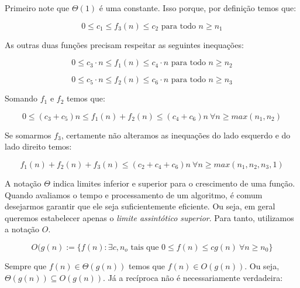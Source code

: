 \begin{example}

  Primeiro note que $\Theta(1)$ é uma constante.
  Isso porque, por definição temos que:

  \begin{displaymath}
    0 \leq c_1 \leq f_3(n) \leq c_2 \textrm{ para todo } n \geq n_1
  \end{displaymath}

  As outras duas funções precisam respeitar as seguintes inequações:

  \begin{displaymath}
    0 \leq c_3\cdot n \leq f_1(n) \leq c_4 \cdot n\textrm{ para todo } n \geq n_2
  \end{displaymath}

  \begin{displaymath}
    0 \leq c_5 \cdot n \leq f_2(n) \leq c_6 \cdot n\textrm{ para todo } n \geq n_3
  \end{displaymath}

  Somando $f_1$ e $f_2$ temos que:

  \begin{displaymath}
    0 \leq (c_3 + c_5)n \leq f_1(n) + f_2(n) \leq (c_4 + c_6)n\ \forall n \geq max(n_1,n_2)
  \end{displaymath}
  
  Se somarmos $f_3$, certamente não alteramos as inequações do lado esquerdo e do lado direito temos:

  \begin{displaymath}
    f_1(n) + f_2(n) + f_3(n)\leq (c_2 + c_4 + c_6)n\ \forall n \geq max(n_1,n_2,n_3,1)
  \end{displaymath}
  
\end{example}

  A notação $\Theta$ indica limites inferior e superior para o crescimento de uma função.
  Quando avaliamos o tempo e processamento de um algoritmo, é comum desejarmos garantir que ele seja suficientemente eficiente.
  Ou seja, em geral queremos estabelecer apenas o {\em limite assintótico superior}.
  Para tanto, utilizamos a notação $O$.

  \begin{displaymath}
    O(g(n) := \{f(n) : \exists c, n_o \textrm{ tais que } 0 \leq f(n) \leq cg(n)\ \forall n \geq n_0 \}
  \end{displaymath}

  Sempre que $f(n) \in \Theta(g(n))$ temos que $f(n) \in O(g(n))$.
  Ou seja, $\Theta(g(n)) \subseteq O(g(n))$.
  Já a recíproca não é necessariamente verdadeira:

